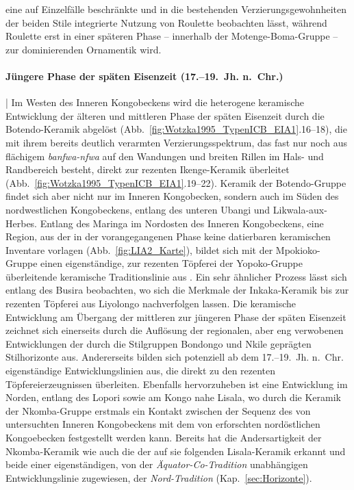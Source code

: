 eine auf Einzelfälle beschränkte und in die bestehenden Verzierungsgewohnheiten der beiden Stile integrierte Nutzung von \mbox{Roulette} beobachten lässt, während \mbox{Roulette} erst in einer späteren Phase -- innerhalb der Motenge-Boma-Gruppe -- zur dominierenden Ornamentik wird.

\paragraph{Jüngere Phase der späten Eisenzeit (17.--19.~Jh. n.~Chr.)}\hspace{-.5em}|\hspace{.5em}%
Im Westen des Inneren Kongobeckens wird die heterogene keramische Entwicklung der älteren und mittleren Phase der späten Eisenzeit durch die Botendo-Keramik abgelöst (Abb.~\ref{fig:Wotzka1995_TypenICB_EIA1}.16--18), die mit ihrem bereits deutlich verarmten Verzierungsspektrum, das fast nur noch aus flächigem \textit{banfwa-nfwa} auf den Wandungen und breiten Rillen im Hals- und Randbereich besteht, direkt zur rezenten Ikenge-Keramik überleitet (Abb.~\ref{fig:Wotzka1995_TypenICB_EIA1}.19--22). Keramik der Botendo-Gruppe findet sich aber nicht nur im Inneren Kongobecken, sondern auch im Süden des nordwestlichen Kongobeckens, entlang des unteren \mbox{Ubangi} und Likwala-aux-Herbes. Entlang des Maringa im Nordosten des Inneren Kongobeckens, eine Region, aus der in der vorangegangenen Phase keine datierbaren keramischen Inventare vorlagen (Abb.~\ref{fig:LIA2_Karte}), bildet sich mit der Mpokioko-Gruppe einen eigenständige, zur rezenten Töpferei der Yopoko-Gruppe überleitende keramische Traditionslinie aus \parencite[223]{Wotzka.1995}. Ein sehr ähnlicher Prozess lässt sich entlang des Busira beobachten, wo sich die Merkmale der Inkaka-Keramik bis zur rezenten Töpferei aus Liyolongo nachverfolgen lassen. Die keramische Entwicklung am Übergang der mittleren zur jüngeren Phase der späten Eisenzeit zeichnet sich einerseits durch die Auflösung der regionalen, aber eng verwobenen Entwicklungen der durch die Stilgruppen Bondongo und Nkile geprägten Stilhorizonte aus. Andererseits bilden sich potenziell ab dem 17.--19.~Jh. n.~Chr. eigenständige Entwicklungslinien aus, die direkt zu den rezenten Töpfereierzeugnissen überleiten. Ebenfalls hervorzuheben ist eine Entwicklung im Norden, entlang des Lopori sowie am Kongo nahe Lisala, wo durch die Keramik der Nkomba-Gruppe erstmals ein Kontakt zwischen der Sequenz des von \textcite{Wotzka.1995} untersuchten Inneren Kongobeckens mit dem von \textcite{LivingstoneSmith.2017} erforschten nordöstlichen Kongoebecken festgestellt werden kann. Bereits \textcite[223\,f.]{Wotzka.1995} hat die Andersartigkeit der Nkomba-Keramik wie auch die der auf sie folgenden Lisala-Keramik erkannt und beide einer eigenständigen, von der \textit{Äquator-Co-Tradition} unabhängigen Entwicklungslinie zugewiesen, der \textit{Nord-Tradition} (Kap.~\ref{sec:Horizonte}).

